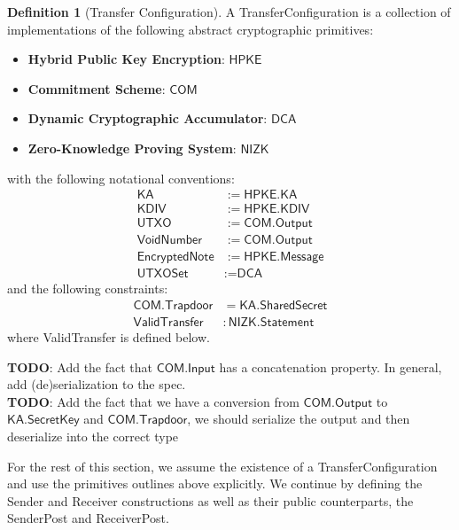 \documentclass[a4paper]{article}
\newcommand{\TODO}[1]{{\color{red}\textbf{TODO}}: #1}
\theoremstyle{definition}
\newtheorem{definition}{Definition}[subsection]
\newcommand{\COM}{{\textsf{COM}}}
\newcommand{\DCA}{{\textsf{DCA}}}
\newcommand{\EncryptedNote}{{\textsf{EncryptedNote}}}
\newcommand{\HPKE}{{\textsf{HPKE}}}
\newcommand{\Input}{{\textsf{Input}}}
\newcommand{\KA}{{\textsf{KA}}}
\newcommand{\KDIV}{{\textsf{KDIV}}}
\newcommand{\Message}{{\textsf{Message}}}
\newcommand{\NIZK}{{\textsf{NIZK}}}
\newcommand{\Output}{{\textsf{Output}}}
\newcommand{\ReceiverPost}{{\textsf{ReceiverPost}}}
\newcommand{\Receiver}{{\textsf{Receiver}}}
\newcommand{\SecretKey}{{\textsf{SecretKey}}}
\newcommand{\SenderPost}{{\textsf{SenderPost}}}
\newcommand{\Sender}{{\textsf{Sender}}}
\newcommand{\SharedSecret}{{\textsf{SharedSecret}}}
\newcommand{\Statement}{{\textsf{Statement}}}
\newcommand{\TransferConfiguration}{{\textsf{TransferConfiguration}}}
\newcommand{\Trapdoor}{{\textsf{Trapdoor}}}
\newcommand{\UTXOSet}{{\textsf{UTXOSet}}}
\newcommand{\UTXO}{{\textsf{UTXO}}}
\newcommand{\ValidTransfer}{{\textsf{ValidTransfer}}}
\newcommand{\VoidNumber}{{\textsf{VoidNumber}}}
\begin{document}
\begin{definition}[Transfer Configuration]
    A \TransferConfiguration{} is a collection of implementations of the following abstract cryptographic primitives:
    \begin{itemize}
        \item \textbf{Hybrid Public Key Encryption}: $\HPKE$
        \item \textbf{Commitment Scheme}: $\COM$
        \item \textbf{Dynamic Cryptographic Accumulator}: $\DCA$
        \item \textbf{Zero-Knowledge Proving System}: $\NIZK$
    \end{itemize}
    with the following notational conventions:
    \begin{align*}
        \KA            &:= \HPKE.\KA \\
        \KDIV          &:= \HPKE.\KDIV \\
        \UTXO          &:= \COM.\Output \\
        \VoidNumber    &:= \COM.\Output \\
        \EncryptedNote &:= \HPKE.\Message \\
        \UTXOSet       &:= \DCA
    \end{align*}
    and the following constraints:
    \begin{align*}
        \COM.\Trapdoor &= \KA.\SharedSecret \\
        \ValidTransfer &: \NIZK.\Statement
    \end{align*}
    where \ValidTransfer{} is defined below.

    \TODO{Add the fact that $\COM.\Input$ has a concatenation property. In general, add (de)serialization to the spec.} \\
    \TODO{Add the fact that we have a conversion from $\COM.\Output$ to $\KA.\SecretKey$ and $\COM.\Trapdoor$, we should serialize the output and then deserialize into the correct type}
\end{definition}

For the rest of this section, we assume the existence of a \TransferConfiguration{} and use the primitives outlines above explicitly. We continue by defining the \Sender{} and \Receiver{} constructions as well as their public counterparts, the \SenderPost{} and \ReceiverPost{}.
\end{document}
